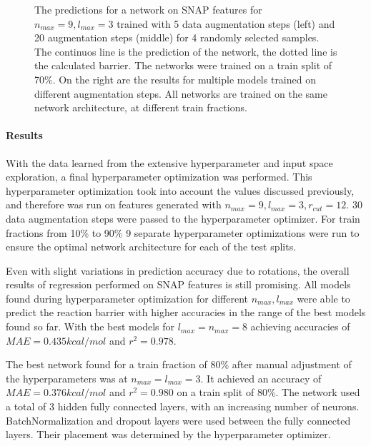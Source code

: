\begin{figure}[!htb]
  \endminipage\hfill
  \caption{
  The predictions for a network on SNAP features for $n_{max}=9, l_{max}=3$ trained with 5 data augmentation steps (left) 
  and 20 augmentation steps (middle) for 4 randomly selected samples. 
  The continuos line is the prediction of the network, the dotted line is the calculated barrier.
  The networks were trained on a train split of 70\%.
  On the right are the results for multiple models trained on different augmentation steps.
  All networks are trained on the same network architecture, at different train fractions.
  }
  \label{fig:snap_roation}

\end{figure}


\paragraph{Results}

With the data learned from the extensive hyperparameter and input space exploration, a final hyperparameter
optimization was performed.
This hyperparameter optimization took into account the values discussed previously, and therefore was run on 
features  generated with $n_{max} = 9, l_{max} = 3, r_{cut}=12$.
30 data augmentation steps were passed to the hyperparameter optimizer.
For train fractions from 10\% to 90\% 9 separate hyperparameter optimizations were run 
to ensure the optimal network architecture for each of the test splits.


Even with slight variations in prediction accuracy due to rotations, the overall results of regression performed on SNAP features is still promising.
All models found during hyperparameter optimization for different $n_{max}, l_{max}$ were able to predict the reaction barrier with higher accuracies in the
range of the best models found so far.
With the best models for $l_{max}=n_{max}=8$ achieving accuracies of $MAE=0.435 kcal/mol$ and $r^2=0.978$. %

The best network found for a train fraction of 80\% after manual adjustment of the hyperparameters was at $n_{max}=l_{max}=3$. %
It achieved an accuracy of $MAE=0.376 kcal/mol$ and $r^2=0.980$ on a train split of 80\%. %
The network used a total of 3 hidden fully connected layers, with an increasing number of neurons.
BatchNormalization and dropout layers were used between the fully connected layers.
Their placement was determined by the hyperparameter optimizer.

